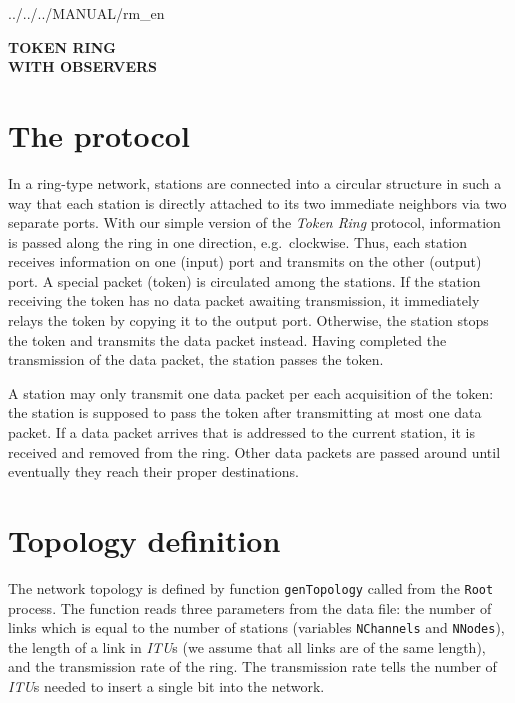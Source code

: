  {../../../MANUAL/rm_en}



\begin{titlepage}

\vspace*{3.5in}
\begin{center}
\Huge\bf TOKEN RING \\ \vspace{0.25in} 
\large WITH OBSERVERS
\end{center}
\end{titlepage}

\section{The protocol}

In a ring-type network, stations are connected into a circular structure
in such a way that each station is directly attached to its two immediate
neighbors via two separate ports.
With our simple version of the {\em Token Ring\/} protocol,
information is passed along
the ring in one direction, e.g.\ 
clockwise.
Thus, each station receives information on one
(input) port and transmits on the other (output) port.
A special packet (token) is circulated among the stations.
If the station receiving the token has
no data packet awaiting transmission, it immediately relays the
token by copying it to the output port.
Otherwise, the station stops the token and transmits the
data packet instead.
Having completed the transmission of the data packet,
the station passes the token.

A
station may only transmit one data packet per each acquisition of the token:
the station is supposed to pass the token after transmitting at most one data
packet.
If a data packet arrives that is addressed to the current station,
it is received and removed from the ring.
Other data packets are passed around until eventually they
reach their proper destinations.

\section{Topology definition}

The network topology is defined by function {\tt genTopology} called from the
{\tt Root} process.
The function reads three parameters from the data file:
the number of links which is
equal to the number of stations (variables {\tt NChannels} and
{\tt NNodes}), the length of a link in {\em ITU\/}s
(we assume that all links are of the same length), and the transmission
rate of the ring.
The transmission rate tells the number of {\em ITU\/}s needed to insert a
single bit into the network.

